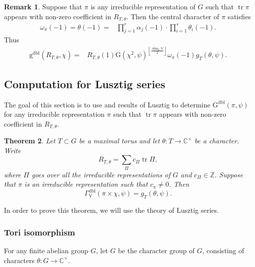 \documentclass[12pt, reqno]{amsart}
\newtheorem{theorem}{Theorem}[section]
\theoremstyle{definition}
\theoremstyle{definition}
\newtheorem{remark}[theorem]{Remark}
\theoremstyle{definition}
\newcommand{\zIntegers}{\mathbb{Z}}
\newcommand{\cComplex}{\mathbb{C}}
\newcommand{\multiplicativegroup}[1]{#1^{\times}}
\newcommand{\hermitianSpace}{\mathrm{V}}
\newcommand{\fieldCharacter}{\psi}
\newcommand{\centralCharacter}[1]{\omega_{#1}}
\newcommand{\trace}{\operatorname{tr}}
\newcommand{\quadraticExtension}{\mathbb{E}}
\newcommand{\GaussSumScalar}[2]{\mathrm{G}\left(#1, #2\right)}
\newcommand{\dblGaussSumScalar}[2]{\mathrm{G}^{\mathrm{dbl}}\left(#1, #2\right)}
\newcommand{\dblVirtualGaussSumScalar}[2]{\mathrm{g}^{\mathrm{dbl}}\left(#1, #2\right)}
\newcommand{\dblGammaFactorSpace}[4]{\Gamma^{\mathrm{dbl}}_{#1}\left(#2 \times #3, #4\right)}
\begin{document}
\begin{remark}
	Suppose that $\pi$ is any irreducible representation of $G$ such that $\trace \pi$ appears with non-zero coefficient in $R_{T,\theta}$. Then the central character of $\pi$ satisfies
	\begin{align*}
		\centralCharacter{\pi}\left(-1\right) = \theta\left(-1\right) =& \prod_{j=1}^r \alpha_j\left(-1\right) \cdot \prod_{i=1}^s \theta_i\left(-1\right).
	\end{align*}
	Thus \begin{align*}
		\dblVirtualGaussSumScalar{R_{T, \theta}}{\chi} =& R_{T,\theta}\left(1\right) \GaussSumScalar{\chi^2}{\fieldCharacter}^{\left\lfloor\frac{\dim_{\quadraticExtension} \hermitianSpace}{2}\right\rfloor} \centralCharacter{\pi}\left(-1\right) g_T\left(\theta, \fieldCharacter\right).
	\end{align*}
\end{remark}

\subsection{Computation for Lusztig series}

The goal of this section is to use  and results of Lusztig to determine $\dblGaussSumScalar{\pi}{\fieldCharacter}$ for any irreducible representation $\pi$ such that $\trace \pi$ appears with non-zero coefficient in $R_{T,\theta}$.

\begin{theorem}
	Let $T \subset G$ be a maximal torus and let $\theta \colon T \to \multiplicativegroup{\cComplex}$ be a character. Write $$R_{T,\theta} = \sum_{\Pi} c_{\Pi} \trace \Pi,$$
	where $\Pi$ goes over all the irreducible representations of $G$ and $c_{\Pi} \in \zIntegers$. Suppose that $\pi$ is an irreducible representation such that $c_{\pi} \ne 0$. Then $$\dblGammaFactorSpace{\hermitianSpace}{\pi}{\chi}{\fieldCharacter} = g_T\left(\theta, \fieldCharacter\right).$$
\end{theorem}
In order to prove this theorem, we will use the theory of Lusztig series.

\subsubsection{Tori isomorphism}

For any finite abelian group $G$, let $\widehat{G}$ be the character group of $G$, consisting of characters $\theta \colon G \to \multiplicativegroup{\cComplex}$.
\end{document}
